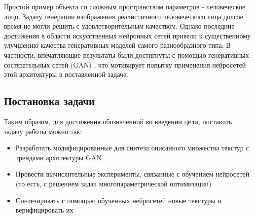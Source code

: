 	Простой пример объекта со сложным пространством параметров - человеческое лицо. Задачу генерации изображения реалистичного человеческого лица долгое время не могли решить с удовлетворительным качеством. Однако последние достижения в области искусственных нейронных сетей привели к существенному улучшению качества генеративных моделей самого разнообразного типа. В частности, впечатляющие результаты были достигнуты с помощью генеративных состязательных сетей (GAN) \cite{cGAN, cGAN-face, EBGAN, BEGAN}, что мотивирует попытку применения нейросетей этой архитектуры в поставленной задаче.
	
	\subsection*{Постановка задачи}
	
	Таким образом, для достижения обозначенной во введении цели, поставить задачу работы можно так:
	
	\begin{itemize}
		\item Разработать модифицированные для синтеза описанного множества текстур с трендами архитектуры GAN
		\item Провести вычислительные эксперименты, связанные с обучением нейросетей (то есть, с решением задач многопараметрической оптимизации)
		\item Синтезировать с помощью обученных нейросетей новые текстуры и верифицировать их
	\end{itemize}